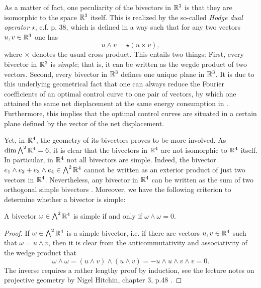 As a matter of fact, one peculiarity of the bivectors in $\mathbb{R}^3$ is that they are isomorphic to the space $\mathbb{R}^3$ itself. This is realized by the so-called \emph{Hodge dual operator} $\star$, c.f. \cite{Lounesto2006} p. 38, which is defined in a way such that for any two vectors $u,v \in \mathbb{R}^3$ one has
\begin{equation}
\label{eq: hodge star}
u \wedge v = \star(u \times v),
\end{equation}
where $\times$ denotes the usual cross product. This entails two things: First, every bivector in $\mathbb{R}^3$ is \emph{simple}; that is, it can be written as the wegde product of two vectors. Second, every bivector in $\mathbb{R}^3$ defines one unique plane in $\mathbb{R}^3$. It is due to this underlying geometrical fact that one can always reduce the Fourier coefficients of an optimal control curve to one pair of vectors, by which one attained the same net displacement at the same energy consumption in \cite{Alouges2017}. Furthermore, this implies that the optimal control curves are situated in a certain plane defined by the vector of the net displacement.

Yet, in $\mathbb{R}^4$, the geometry of its bivectors proves to be more involved. As $\dim \bigwedge^2 \mathbb{R}^4 = 6$, it is clear that the bivectors in $\mathbb{R}^4$ are not isomorphic to $\mathbb{R}^4$ itself. In particular, in $\mathbb{R}^4$ not all bivectors are simple. Indeed, the bivector $e_1 \wedge e_2 + e_3 \wedge e_4 \in \bigwedge^2 \mathbb{R}^4$ cannot be written as an exterior product of just two vectors in $\mathbb{R}^4$. Nevertheless, any bivector in $\mathbb{R}^4$ can be written as the sum of two orthogonal simple bivectors \cite{Lounesto2006}. Moreover, we have the following criterion to determine whether a bivector is simple:

\begin{lemma}
\label{lem:simple bivector}
A bivector $\omega \in \bigwedge^2 \mathbb{R}^4$ is simple if and only if $\omega \wedge \omega = 0$.
\end{lemma}

\begin{proof}
If $\omega \in \bigwedge^2 \mathbb{R}^4$ is a simple bivector, i.e. if there are vectors $u,v \in \mathbb{R}^4$ such that $\omega = u \wedge v$, then it is clear from the anticommutativity and associativity of the wedge product that
\begin{equation}
\omega \wedge \omega = (u \wedge v) \wedge (u \wedge v) = - u \wedge u \wedge v \wedge v = 0.
\end{equation}
The inverse requires a rather lengthy proof by induction, see the lecture notes on projective geometry by Nigel Hitchin, chapter 3, p.48 \cite{Hitchin2003}.
\end{proof}


